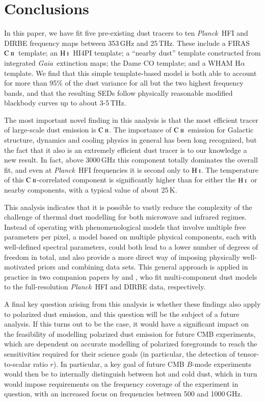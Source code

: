 \documentclass{aa}
\newcommand{\mathsc}[1]{{\normalfont\textsc{#1}}}
\def\Planck{\textit{Planck}}
\def\GAIA{\textit{Gaia}}
\newcommand{\CII}{\ensuremath{\mathsc{C\ ii}}}
\newcommand{\HI}{\ensuremath{\mathsc{H\ i}}}
\begin{document}
\section{Conclusions}
\label{sec:conclusions}

In this paper, we have fit five pre-existing dust tracers to ten
\Planck\ HFI and DIRBE frequency maps between 353\,GHz and
25\,THz. These include a FIRAS \CII\ template; an \HI\ HI4PI template;
a ``nearby dust'' template constructed from integrated
\GAIA\ extinction maps; the Dame CO template; and a WHAM H$\alpha$
template. We find that this simple template-based model is both able
to account for more than 95\% of the dust variance for all but the two
highest frequency bands, and that the resulting SEDs follow physically
reasonable modified blackbody curves up to about 3-5\,THz.

The most important novel finding in this analysis is that the most
efficient tracer of large-scale dust emission is \CII. The importance
of \CII\ emission for Galactic structure, dynamics and cooling physics
in general has been long recognized, but the fact that it also is an
extremely efficient dust tracer is to our knowledge a new result. In
fact, above 3000\,GHz this component totally dominates the overall
fit, and even at \Planck\ HFI frequencies it is second only to \HI. The
temperature of this \CII-correlated component is significantly higher
than for either the \HI\ or nearby components, with a typical value of
about 25\,K. 

This analysis indicates that it is possible to vastly reduce the
complexity of the challenge of thermal dust modelling for both
microwave and infrared regimes. Instead of operating with
phenomenological models that involve multiple free parameters per
pixel, a model based on multiple physical components, each with
well-defined spectral parameters, could both lead to a lower number of
degrees of freedom in total, and also provide a more direct way of
imposing physically well-motivated priors and combining data
sets. This general approach is applied in practice in two companion
papers by \citet{CG02_06} and \citet{CG02_07}, who fit multi-component
dust models to the full-resolution \Planck\ HFI and DIRBE data,
respectively. 

A final key question arising from this analysis is whether these
findings also apply to polarized dust emission, and this question will
be the subject of a future analysis. If this turns out to be the case,
it would have a significant impact on the feasibility of modelling
polarized dust emission for future CMB experiments, which are
dependent on accurate modelling of polarized foregrounds to reach the
sensitivities required for their science goals (in particular, the
detection of tensor-to-scalar ratio $r$). In particular, a key goal of future CMB $B$-mode
experiments would then be to internally distinguish between hot and
cold dust, which in turn would impose requirements on the frequency
coverage of the experiment in question, with an increased focus on
frequencies between 500 and 1000\,GHz.
\end{document}
